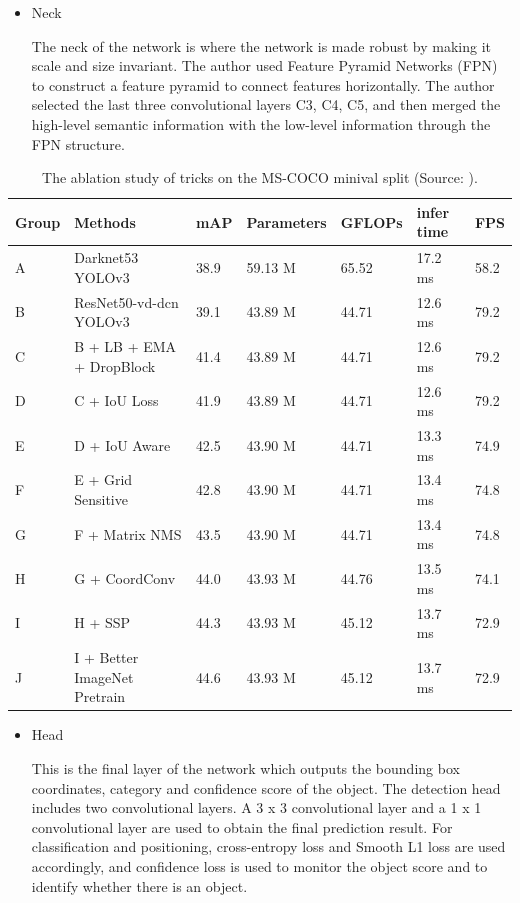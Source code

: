 \documentclass[journal,article,submit,moreauthors,pdftex]{Definitions/mdpi}
\begin{document}
\begin{itemize}
\item{Neck}

The neck of the network is where the network is made robust by making it scale and size invariant. The author used Feature Pyramid Networks (FPN) to construct a feature pyramid to connect features horizontally. The author selected the last three convolutional layers C3, C4, C5, and then merged the high-level semantic information with the low-level information through the FPN structure.

\end{itemize}








\begin{table}[!htbp]
\centering
\caption{The ablation study of tricks on the MS-COCO minival split (Source: \cite{long2020pp}).}
\begin{tabular}{lllllll} 
\toprule
\textbf{Group}&\textbf{Methods}&\textbf{mAP}&\textbf{Parameters}&\textbf{GFLOPs}&\textbf{infer time}&\textbf{FPS}\\
\midrule
A& Darknet53 YOLOv3 &38.9 & 59.13 M& 65.52 & 17.2 ms &58.2\\
\cmidrule(r){1-7}
B& ResNet50-vd-dcn YOLOv3 &39.1 & 43.89 M & 44.71 & 12.6 ms & 79.2\\
C& B + LB + EMA + DropBlock& 41.4 & 43.89 M & 44.71 & 12.6 ms &79.2\\
D& C + IoU Loss& 41.9 & 43.89 M & 44.71 & 12.6 ms &79.2\\
E& D + IoU Aware & 42.5 & 43.90 M & 44.71 & 13.3 ms &74.9\\
F& E + Grid Sensitive& 42.8 & 43.90 M & 44.71 & 13.4 ms &74.8\\
G& F + Matrix NMS& 43.5 & 43.90 M & 44.71 & 13.4 ms &74.8\\
H& G + CoordConv& 44.0 & 43.93 M & 44.76 & 13.5 ms &74.1\\
I& H + SSP& 44.3 & 43.93 M & 45.12 & 13.7 ms &72.9\\
J& I + Better ImageNet Pretrain& 44.6& 43.93 M & 45.12 & 13.7 ms& 72.9\\
\bottomrule
\end{tabular}
\label{tbl:ablation study pp-yolo}
\end{table}

\begin{itemize}
\item{Head}

This is the final layer of the network which outputs the bounding box coordinates, category and confidence score of the object. The detection head includes two convolutional layers. A 3 x 3 convolutional layer and a 1 x 1 convolutional layer are used to obtain the final prediction result. For classification and positioning, cross-entropy loss and Smooth L1 loss are used accordingly, and confidence loss is used to monitor the object score and to identify whether there is an object.
\end{itemize}
\end{document}
